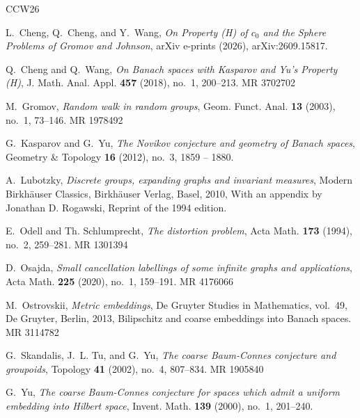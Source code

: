 \documentclass[11pt]{amsart}
\theoremstyle{definition}
\theoremstyle{remark}
\begin{document}
 \providecommand{\bysame}{\leavevmode\hbox to3em{\hrulefill}\thinspace}
\providecommand{\MR}{\relax\ifhmode\unskip\space\fi MR }
\providecommand{\MRhref}[2]{%
  \href{http://www.ams.org/mathscinet-getitem?mr=#1}{#2}
}
\providecommand{\href}[2]{#2}
\begin{thebibliography}{CCW26}

L.~{Cheng}, Q.~{Cheng}, and Y.~{Wang}, \emph{{On Property (H) of $c_0$ and the
  Sphere Problems of Gromov and Johnson}}, arXiv e-prints (2026),
  arXiv:2609.15817.

Q.~Cheng and Q.~Wang, \emph{On {B}anach spaces with {K}asparov and {Y}u's
  {P}roperty ({H})}, J. Math. Anal. Appl. \textbf{457} (2018), no.~1, 200--213.
  \MR{3702702}

M.~Gromov, \emph{Random walk in random groups}, Geom. Funct. Anal. \textbf{13}
  (2003), no.~1, 73--146. \MR{1978492}

G.~Kasparov and G.~Yu, \emph{{The Novikov conjecture and geometry of Banach
  spaces}}, Geometry \& Topology \textbf{16} (2012), no.~3, 1859 -- 1880.

A.~Lubotzky, \emph{Discrete groups, expanding graphs and invariant measures},
  Modern Birkh\"{a}user Classics, Birkh\"{a}user Verlag, Basel, 2010, With an
  appendix by Jonathan D. Rogawski, Reprint of the 1994 edition.

E.~Odell and Th. Schlumprecht, \emph{The distortion problem}, Acta Math.
  \textbf{173} (1994), no.~2, 259--281. \MR{1301394}

D.~Osajda, \emph{Small cancellation labellings of some infinite graphs and
  applications}, Acta Math. \textbf{225} (2020), no.~1, 159--191. \MR{4176066}

M.~Ostrovskii, \emph{Metric embeddings}, De Gruyter Studies in Mathematics,
  vol.~49, De Gruyter, Berlin, 2013, Bilipschitz and coarse embeddings into
  Banach spaces. \MR{3114782}

G.~Skandalis, J.~L. Tu, and G.~Yu, \emph{The coarse {B}aum-{C}onnes conjecture
  and groupoids}, Topology \textbf{41} (2002), no.~4, 807--834. \MR{1905840}

G.~Yu, \emph{The coarse {B}aum-{C}onnes conjecture for spaces which admit a
  uniform embedding into {H}ilbert space}, Invent. Math. \textbf{139} (2000),
  no.~1, 201--240.

\end{thebibliography}
\end{document}
